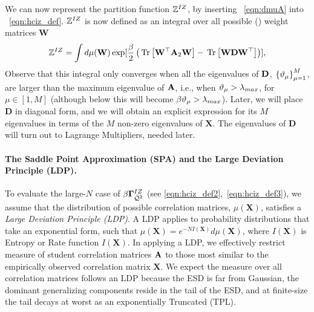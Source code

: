 We can now represent the partition function
$\mathbb{Z}^{IZ}$, by inserting \EQN~\ref{eqn:dmuA} into \EQN~\ref{eqn:hciz_def}.
$\mathbb{Z}^{IZ}$ is now defined as an integral over all
possible (\Teacher) weight matrices $\mathbf{W}$
\begin{equation}
  \label{eqn:ZD0}
    \mathbb{Z}^{IZ}=\int d\mu(\mathbf{W})\exp[\frac{\beta}{2}\left
    (\mbox{}\operatorname{Tr}\left[\mathbf{W}^{\top}\mathbf{A}_{2}\mathbf{W}\right]-\mbox{}\operatorname{Tr}\left[\mathbf{W}\mathbf{D}\mathbf{W}^{\top}\right]  
    \right)]  ,
\end{equation}
Observe that this integral only converges when all the eigenvalues of $\mathbf{D}$, 
$\left\{ \vartheta_{\mu} \right\}_{\mu=1}^{M}$, 
are larger than the maximum eigenvalue of $\mathbf{\mathbf{A}}$, i.e., when $\vartheta_{\mu} >\lambda_{max}$, for $\mu\in[1,M]$
(although below this will become $\beta\vartheta_{\mu} >\lambda_{max}$).
Later, we will place $\mathbf{D}$ in diagonal form, and we will obtain an explicit expression for its $M$ eigenvalues in terms of the $M$ non-zero eigenvalues of $\mathbf{X}$.
The eigenvalues of $\mathbf{D}$ will turn out to Lagrange Multipliers, needed later.


\paragraph{The Saddle Point Approximation (SPA) and the Large Deviation Principle (LDP).}

To evaluate the large-$N$ case of $\beta\mathbf{\Gamma}^{IZ}_{\bar{\mathcal{Q}}^{2}}$ (see \ref{eqn:hciz_def2},~\ref{eqn:hciz_def3}), 
we assume that the distribution of possible \Teacher correlation matrices,
$\mu(\mathbf{X})$, satisfies a \emph{Large Deviation Principle (LDP)}.
A LDP applies to probability distributions that take an exponential form,
such that $\mu(\mathbf{X})=e^{-N I(\mathbf{X})}d\mu(\mathbf{X})$,
where  $I(\mathbf{X})$ is Entropy or Rate function $I(\mathbf{X})$.
In applying a LDP, we effectively restrict measure of student correlation matrices $\mathbf{\mathbf{A}}$
to those most similar to the empirically observed \Teacher correlation matrix $\mathbf{X}$.
%
We expect the measure over all \Teacher correlation matrices
follows an LDP because the ESD is far from Gaussian,
the dominant generalizing components reside in the tail of the ESD,
and at finite-size the tail decays at worst as an exponentially
Truncated \PowerLaw (TPL).

